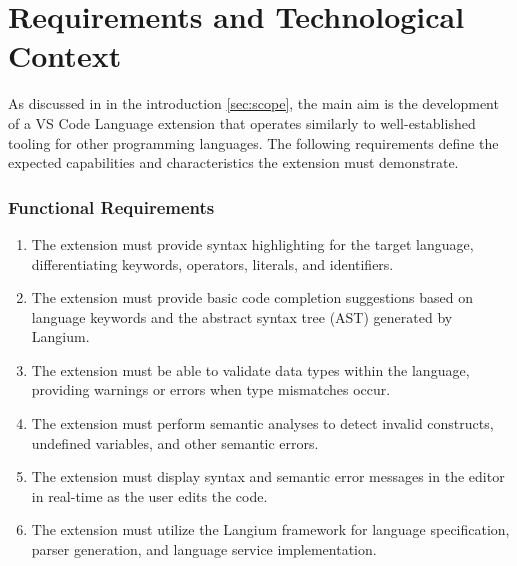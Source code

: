 \chapter{Requirements and Technological Context}

As discussed in in the introduction \ref{sec:scope}, the main aim is the development of a VS Code Language extension that operates similarly to
well-established tooling for other programming languages. The following requirements define the expected capabilities and characteristics the extension must demonstrate.

\begin{multicols}{2}
  \subsection*{Functional Requirements}
  \begin{enumerate}
    \item The extension must provide syntax highlighting for the target language, differentiating keywords, operators, literals, and identifiers.
    \item The extension must provide basic code completion suggestions based on language keywords and the abstract syntax tree (AST) generated by Langium.
    \item The extension must be able to validate data types within the language, providing warnings or errors when type mismatches occur.
    \item The extension must perform semantic analyses to detect invalid constructs, undefined variables, and other semantic errors.
    \item The extension must display syntax and semantic error messages in the editor in real-time as the user edits the code.
    \item The extension must utilize the Langium framework for language specification, parser generation, and language service implementation.
  \end{enumerate}

  \columnbreak


\end{multicols}

